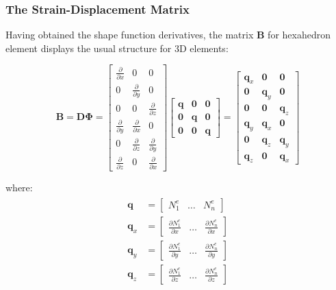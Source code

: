 \documentclass[10pt,b5paper,titlepage]{book}
\newcommand{\m}{\mathbf}
\newenvironment{eqarray}
{
    \begin{eqnarray}
        \begin{aligned}
}
{
        \end{aligned}
    \end{eqnarray}
}
\begin{document}
\subsubsection{The Strain-Displacement Matrix}

Having obtained the shape function derivatives, the matrix $ \m{B} $ for hexahedron
element displays the usual structure for 3D elements:

\begin{equation}
    \m{B} = \m{D}\m{\Phi} =
    \begin{bmatrix}
        \frac{\partial}{\partial x} & 0 & 0 \\
        0 & \frac{\partial}{\partial y} & 0 \\
        0 & 0 & \frac{\partial}{\partial z} \\
        \frac{\partial}{\partial y} & \frac{\partial}{\partial x} & 0 \\
        0 & \frac{\partial}{\partial z} & \frac{\partial}{\partial y} \\
        \frac{\partial}{\partial z} & 0 & \frac{\partial}{\partial x}
    \end{bmatrix}
    \begin{bmatrix}
        \m{q} & \m{0} & \m{0} \\
        \m{0} & \m{q} & \m{0} \\
        \m{0} & \m{0} & \m{q}
    \end{bmatrix} =
    \begin{bmatrix}
        \m{q}_x & \m{0} & \m{0} \\
        \m{0} & \m{q}_y & \m{0} \\
        \m{0} & \m{0} & \m{q}_z \\
        \m{q}_y & \m{q}_x & \m{0} \\
        \m{0} & \m{q}_z & \m{q}_y \\
        \m{q}_z & \m{0} & \m{q}_x
    \end{bmatrix}
\end{equation}

where:
\begin{eqarray}
    \m{q} &= \begin{bmatrix} N_1^e & \dots & N_n^e \end{bmatrix}\\
    \m{q}_x &= \begin{bmatrix} \frac{\partial N_1^e}{\partial x} & \dots & \frac{\partial N_n^e}{\partial x} \end{bmatrix}\\
    \m{q}_y &= \begin{bmatrix} \frac{\partial N_1^e}{\partial y} & \dots & \frac{\partial N_n^e}{\partial y} \end{bmatrix}\\
    \m{q}_z &= \begin{bmatrix} \frac{\partial N_1^e}{\partial z} & \dots & \frac{\partial N_n^e}{\partial z} \end{bmatrix}
\end{eqarray}
\end{document}
